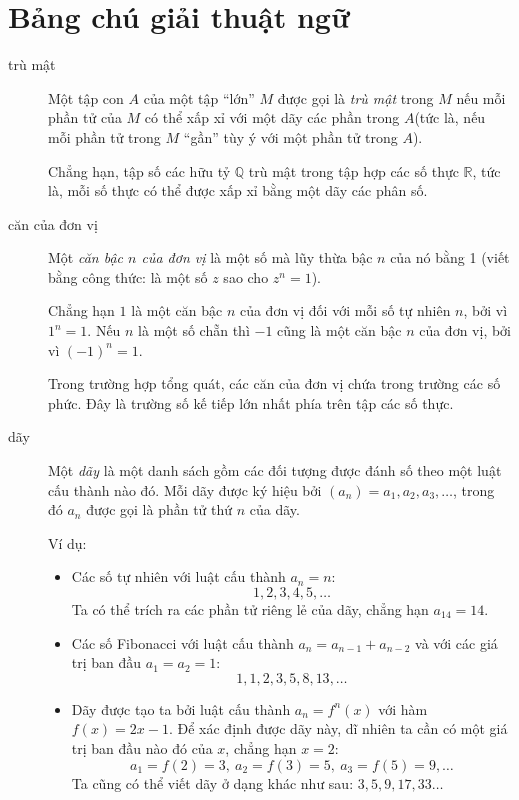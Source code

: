 \section*{Bảng chú giải thuật ngữ}
\begin{description}
	\item[trù mật] Một tập con $A$ của một tập \enquote{lớn} $M$ được gọi là \emph{trù mật} trong $M$ nếu mỗi phần tử của $M$ có  thể  xấp xỉ với một dãy các phần  trong $A$(tức là, nếu mỗi phần tử trong $M$ \enquote{gần} tùy ý với một phần tử trong $A$).

		Chẳng hạn, tập số các hữu tỷ $\mathbb Q$ trù mật trong tập hợp các số thực $\mathbb R$, tức là, mỗi số thực có thể được xấp xỉ bằng một dãy các phân số. 

	\item[căn của đơn vị]  Một \emph{căn bậc $n$ của đơn vị } là một số  mà  lũy thừa  bậc $n$ của nó bằng 1 (viết bằng công thức: là một số $z$ sao cho $z^n=1$). 

		Chẳng hạn $1$ là một căn bậc $n$ của đơn vị đối với mỗi số tự nhiên $n$, bởi vì $1^n=1$. Nếu $n$ là một số chẵn thì $-1$ cũng là một căn bậc $n$ của đơn vị, bởi vì $(-1)^n=1$.

		Trong trường hợp tổng quát, các căn của đơn vị chứa trong trường các số phức. Đây là trường số kế tiếp  lớn nhất phía trên tập các số thực. 

	\item[dãy]  Một \emph{dãy} là một danh sách gồm các đối tượng được đánh số  theo một  luật cấu thành nào đó.  Mỗi dãy  được ký hiệu bởi  $(a_n) = a_1,a_2,a_3,\dots $, trong đó $a_n$ được gọi là phần tử thứ $n$ của dãy. 

		Ví dụ:
		\begin{itemize}
		\item Các số tự nhiên với luật cấu  thành  $a_n = n$:
		\begin{equation*}
		1,2,3,4,5,\dots{}
		\end{equation*}
		Ta có thể trích ra các phần tử riêng lẻ của dãy, chẳng hạn  $a_{14} = 14$. 
		\item Các số  Fibonacci với luật cấu thành $a_n = a_{n-1}+a_{n-2}$  và với các giá trị ban đầu $a_1 = a_2 = 1$:
		\begin{equation*}
		1,1,2,3,5,8,13,\dots{}
		\end{equation*}
		\item Dãy được tạo ta bởi  luật cấu thành $a_n = f^n(x)$ với hàm   $f(x) = 2x-1$. Để xác định được dãy này,  dĩ nhiên ta cần có một giá trị ban đầu nào đó của $x$, chẳng hạn  $x=2$: 
		\begin{equation*}
		a_1 = f(2) = 3,\ a_2 = f(3) = 5,\ a_3 = f(5) = 9,\dots
		\end{equation*}
		Ta cũng có thể viết dãy ở dạng khác như sau: $3,5,9,17,33\dots{}$
		\end{itemize}


\end{description}
